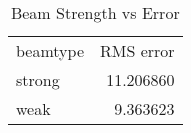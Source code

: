\begin{table}
\caption{Beam Strength vs Error}
\begin{tabular}{lr}
beamtype & RMS error  \\
strong & 11.206860 \\
weak & 9.363623 \\
\end{tabular}
\end{table}
